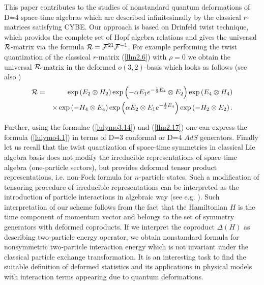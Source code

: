 \documentclass[a4paper,12pt,showkeys]{article}
\begin{document}
\hspace{12pt} This paper contributes to the  studies of nonstandard quantum deformations of D=4
 space-time algebras which are described infinitesimally by the classical $r$-matrices
 satisfying CYBE. Our approach is based on Drinfeld twist technique, which provides
 the complete set of Hopf algebra relations and gives the universal
 ${\cal R}$-matrix via the formula
 ${\cal R}= {\cal F}^{21} {\cal F}^{-1}$. For example  performing  the
  twist quantization of the classical
   $r$-matrix (\ref{llm2.6}) with $\rho=0$
   we obtain
the universal
${\cal R}$-matrix in the deformed $o(3,2)$-basis
   which   looks as follows
   (see also
    \cite{ll16})
  \begin{eqnarray}\label{lulymo4.1}
{\cal R} &=&\exp \left( {E}_{2}\otimes H_{2}\right) \exp
\left( -\alpha E_{1}e^{-\frac{1}{2}{ E }_{4}}\otimes E_{2}\right)
\exp \left( { E }_{4}\otimes H_{4}\right)
\cr
&&\times \exp \left( -H_{4}\otimes {E }_{4}\right) \exp \left(
\alpha E_{2}\otimes E_{1}e^{-\frac{1}{2}{E}_{4}}\right) \exp
\left( -H_{2}\otimes {E }_{2}\right) .
\end{eqnarray}

Further, using the formulae (\ref{lulymo3.14}) and
    (\ref{llm2.17}) one can express the formula
(\ref{lulymo4.1}) in terms of D=3 conformal or D=4 $AdS$ generators.
Finally let us recall that
   the twist quantization of space-time symmetries in classical Lie algebra basis
   does not modify the irreducible representations of space-time algebra
   (one-particle sectors),
 but  provides deformed tensor   product representations, i.e. non-Fock
formula for $n$-particle states. Such a modification of tensoring
procedure of irreducible representations  can
    be interpreted as the introduction of particle interactions
    in algebraic way (see e.g.
     \cite{ll17,ll18}).
     Such interpretation of our  scheme follows  from
the fact that the Hamiltonian $H$ is the time component of momentum vector
 and belongs to the set of symmetry generators with deformed coproducts. If we
interpret  the coproduct $\Delta(H)$ as describing two-particle energy
operator, we obtain nonstandard formula for nonsymmetric two-particle
interaction energy which is not invariant under the
 classical   particle exchange transformation.
It is
 an interesting task
  to find the suitable definition of deformed statistics
 and its applications in physical models
  with \sloppy
   interaction terms appearing due to quantum deformations.
\end{document}
